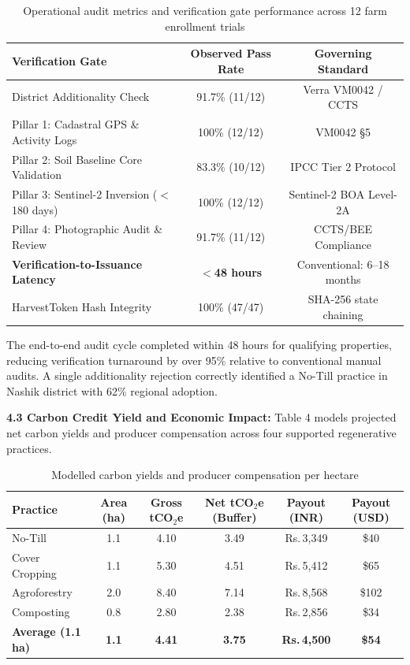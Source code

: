 \documentclass[11pt,a4paper]{article}
\newcommand{\rupee}{Rs.\,}
\begin{document}
\begin{table}[H]
\caption{Operational audit metrics and verification gate performance across 12 farm enrollment trials}
\centering
\begin{tabular}{l c c}
\toprule
\textbf{Verification Gate} & \textbf{Observed Pass Rate} & \textbf{Governing Standard} \\
\midrule
District Additionality Check & 91.7\% (11/12) & Verra VM0042 / CCTS \\
Pillar 1: Cadastral GPS \& Activity Logs & 100\% (12/12) & VM0042 §5 \\
Pillar 2: Soil Baseline Core Validation & 83.3\% (10/12) & IPCC Tier 2 Protocol \\
Pillar 3: Sentinel-2 Inversion ($<$180 days) & 100\% (12/12) & Sentinel-2 BOA Level-2A \\
Pillar 4: Photographic Audit \& Review & 91.7\% (11/12) & CCTS/BEE Compliance \\
\textbf{Verification-to-Issuance Latency} & \textbf{$<$48 hours} & Conventional: 6--18 months \\
HarvestToken Hash Integrity & 100\% (47/47) & SHA-256 state chaining \\
\bottomrule
\end{tabular}
\end{table}

The end-to-end audit cycle completed within 48 hours for qualifying properties, reducing verification turnaround by over 95\% relative to conventional manual audits. A single additionality rejection correctly identified a No-Till practice in Nashik district with 62\% regional adoption.

\noindent \textbf{4.3 Carbon Credit Yield and Economic Impact:} 
Table 4 models projected net carbon yields and producer compensation across four supported regenerative practices.

\begin{table}[H]
\caption{Modelled carbon yields and producer compensation per hectare}
\centering
\begin{tabular}{l c c c c c}
\toprule
\textbf{Practice} & \textbf{Area (ha)} & \textbf{Gross tCO$_2$e} & \textbf{Net tCO$_2$e (Buffer)} & \textbf{Payout (INR)} & \textbf{Payout (USD)} \\
\midrule
No-Till & 1.1 & 4.10 & 3.49 & \rupee 3,349 & \$40 \\
Cover Cropping & 1.1 & 5.30 & 4.51 & \rupee 5,412 & \$65 \\
Agroforestry & 2.0 & 8.40 & 7.14 & \rupee 8,568 & \$102 \\
Composting & 0.8 & 2.80 & 2.38 & \rupee 2,856 & \$34 \\
\midrule
\textbf{Average (1.1 ha)} & \textbf{1.1} & \textbf{4.41} & \textbf{3.75} & \textbf{\rupee 4,500} & \textbf{\$54} \\
\bottomrule
\end{tabular}
\end{table}
\end{document}
